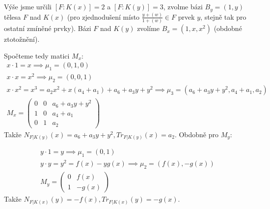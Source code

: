 \documentclass[12pt, a4paper]{article}
\begin{document}
\section{}
Výše jsme určili $[F:K(x)]=2$ a $[F:K(y)] = 3$, zvolme bázi $B_y = (1,y)$ tělesa $F$ nad $K(x)$ (pro zjednodušení místo $\frac{y+(w)}{1+(w)} \in F$ prvek $y$, stejně tak pro ostatní zmíněné prvky). Bázi $F$ nad $K(y)$ zvolíme $B_x=(1,x,x^2)$ (obdobné ztotožnění).

Spočteme tedy matici $M_x$:
\begin{gather*}
x\cdot 1 = x \implies \mu_1 = (0, 1, 0)\\
x\cdot x = x^2 \implies \mu_2 = (0, 0, 1)\\
x\cdot x^2 = x^3 = a_2x^2+x(a_4+a_1) + a_6 + a_3y + y^2 \implies \mu_3 = (a_6 + a_3y + y^2, a_4+a_1, a_2)\\
M_x = \begin{pmatrix}
0 & 0 & a_6 + a_3y + y^2\\
1 & 0 & a_4+a_1\\
0 & 1 & a_2
\end{pmatrix}
\end{gather*}
Takže $N_{F|K(y)}(x) = a_6 + a_3y + y^2, Tr_{F|K(y)}(x)=a_2$. Obdobně pro $M_y$:

\begin{gather*}
y\cdot 1 = y \implies \mu_1 = (0, 1)\\
y\cdot y = y^2 = f(x)-yg(x) \implies \mu_2 = (f(x),-g(x))\\
M_y = \begin{pmatrix}
0 & f(x)\\
1 & -g(x)
\end{pmatrix}
\end{gather*}
Takže $N_{F|K(x)}(y) = -f(x), Tr_{F|K(x)}(y)=-g(x)$.
\end{document}

